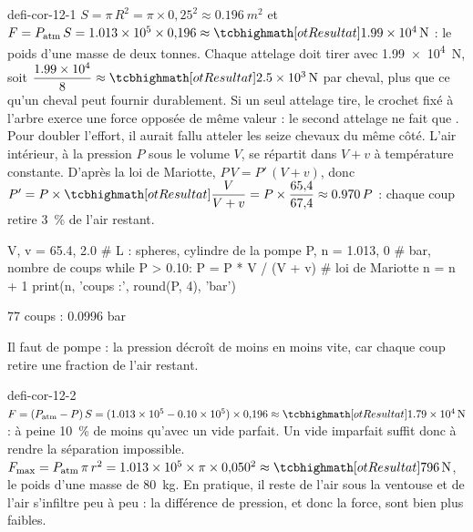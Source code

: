 \begin{blocEdition}{defi-cor-12-1}
$S=\pi\,R^2=\pi\times0{,}25^2\approx\qty{0,196}{m^2}$ et $F=P_\mathrm{atm}\,S=\num{1,013e5}\times0{,}196\approx\res{\qty{1,99e4}{N}}$ : le poids d'une masse de deux tonnes.
Chaque attelage doit tirer avec \qty{1,99e4}{N}, soit $\dfrac{\num{1,99e4}}{8}\approx\res{\qty{2,5e3}{N}}$ par cheval, plus que ce qu'un cheval peut fournir
durablement. Si un seul attelage tire, le crochet fixé à l'arbre exerce une force opposée de même valeur : le second
attelage ne fait que . Pour doubler l'effort, il aurait fallu atteler les seize chevaux du même côté.
L'air intérieur, à la pression $P$ sous le volume $V$, se répartit dans $V+v$ à température constante. D'après la loi de Mariotte,
$P\,V=P'\,(V+v)$, donc $P'=P\times\res{\dfrac{V}{V+v}}=P\times\dfrac{65{,}4}{67{,}4}\approx\num{0,970}\,P$ : chaque coup retire \qty{3}{\percent} de l'air restant.
\begin{python}
V, v = 65.4, 2.0          # L : spheres, cylindre de la pompe
P, n = 1.013, 0           # bar, nombre de coups
while P > 0.10:
    P = P * V / (V + v)   # loi de Mariotte
    n = n + 1
print(n, 'coups :', round(P, 4), 'bar')
\end{python}
\begin{console}
77 coups : 0.0996 bar
\end{console}
Il faut  de pompe : la pression décroît de moins en moins vite, car chaque coup retire une fraction de l'air restant.
\end{blocEdition}

\begin{blocEdition}{defi-cor-12-2}
\label{figedition-defi-cor-12-2-1}
$F=(P_\mathrm{atm}-P)\,S=(\num{1,013e5}-\num{0,10e5})\times0{,}196\approx\res{\qty{1,79e4}{N}}$ : à peine \qty{10}{\percent} de moins qu'avec un vide parfait. Un vide
imparfait suffit donc à rendre la séparation impossible.
$F_\mathrm{max}=P_\mathrm{atm}\,\pi\,r^2=\num{1,013e5}\times\pi\times0{,}050^2\approx\res{\qty{796}{N}}$, le poids d'une masse de \qty{80}{kg}. En pratique, il reste de
l'air sous la ventouse et de l'air s'infiltre peu à peu : la différence de pression, et donc la force, sont bien plus faibles.
\end{blocEdition}


